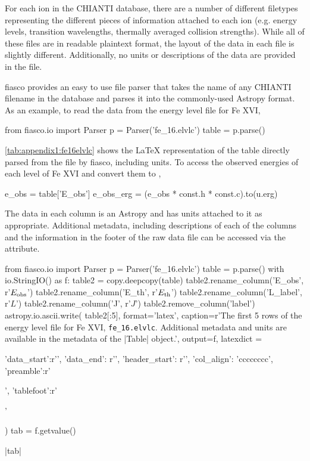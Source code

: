 For each ion in the CHIANTI database, there are a number of different filetypes representing the different pieces of information attached to each ion (e.g. energy levels, transition wavelengths, thermally averaged collision strengths). While all of these files are in readable plaintext format, the layout of the data in each file is slightly different. Additionally, no units or descriptions of the data are provided in the file.

fiasco provides an easy to use file parser that takes the name of any CHIANTI filename in the database and parses it into the commonly-used Astropy  format. As an example, to read the data from the energy level file for Fe XVI,
\begin{pyverbatim}[appendix1][baselinestretch=1,xleftmargin=3em]
from fiasco.io import Parser
p = Parser('fe_16.elvlc')
table = p.parse()
\end{pyverbatim}
\autoref{tab:appendix1:fe16elvlc} shows the \LaTeX{} representation of the table directly parsed from the file by fiasco, including units. To access the observed energies of each level of Fe XVI and convert them to \si{\erg},
\begin{pyverbatim}[appendix1][baselinestretch=1,xleftmargin=3em]
e_obs = table['E_obs']
e_obs_erg = (e_obs * const.h * const.c).to(u.erg)
\end{pyverbatim}
The data in each column is an Astropy  and has units attached to it as appropriate. Additional metadata, including descriptions of each of the columns and the information in the footer of the raw data file can be accessed via the  attribute.

\begin{pycode}[appendix1]
from fiasco.io import Parser
p = Parser('fe_16.elvlc')
table = p.parse()
with io.StringIO() as f:
    table2 = copy.deepcopy(table)
    table2.rename_column('E_obs', r'$E_\textup{obs}$')
    table2.rename_column('E_th', r'$E_\textup{th}$')
    table2.rename_column('L_label', r'$L$')
    table2.rename_column('J', r'$J$')
    table2.remove_column('label')
    astropy.io.ascii.write(
        table2[:5],
        format='latex',
        caption=r'The first 5 rows of the energy level file for Fe XVI, \texttt{fe\_16.elvlc}. Additional metadata and units are available in the metadata of the \pyv|Table| object.\label{tab:appendix1:fe16elvlc}',
        output=f,
        latexdict = { 'data_start':r'\midrule', 'data_end': r'\bottomrule',
                      'header_start': r'\toprule', 'col_align': 'cccccccc',
                      'preamble':r'\begin{center}', 'tablefoot':r'\end{center}'
                    }
    )
    tab = f.getvalue()
\end{pycode}
\py[appendix1]|tab|

